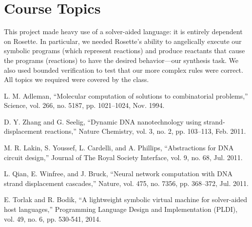 \documentclass{article}
\begin{document}
\section{Course Topics}

This project made heavy use of a solver-aided language: it is entirely dependent
on Rosette. In particular, we needed Rosette's ability to angelically execute
our symbolic programs (which represent reactions) and produce reactants that
cause the programs (reactions) to have the desired behavior---our synthesis
task. We also used bounded verification to test that our more complex
rules were correct. All topics we required were covered by the class.

\begin{thebibliography}{9}

L. M. Adleman,
“Molecular computation of solutions to combinatorial problems,”
Science, vol. 266, no. 5187, pp. 1021–1024, Nov. 1994.

D. Y. Zhang and G. Seelig,
“Dynamic DNA nanotechnology using strand-displacement reactions,”
Nature Chemistry, vol. 3, no. 2, pp. 103–113, Feb. 2011.

M. R. Lakin, S. Youssef, L. Cardelli, and A. Phillips,
“Abstractions for DNA circuit design,”
Journal of The Royal Society Interface, vol. 9, no. 68, Jul. 2011.

L. Qian, E. Winfree, and J. Bruck, “Neural network computation with DNA strand
displacement cascades,” Nature, vol. 475, no. 7356, pp. 368–372, Jul. 2011.

  E. Torlak and R. Bodik, “A lightweight symbolic virtual machine for solver-aided host languages,” Programming Language Design and Implementation (PLDI), vol. 49, no. 6, pp. 530-541, 2014.

\end{thebibliography}
\end{document}
